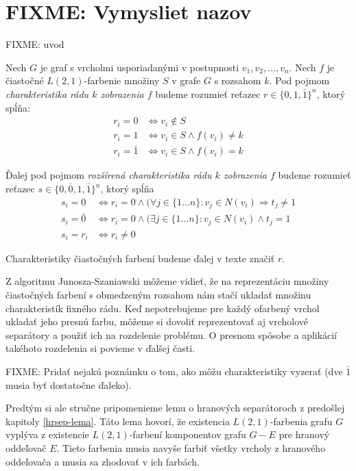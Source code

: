 \chapter{FIXME: Vymysliet nazov}

FIXME: uvod

\begin{defn}
    Nech $G$ je graf s vrcholmi usporiadanými v postupnosti $v_1,v_2, \ldots, v_n$.
    Nech $f$ je čiastočné $L(2,1)$-farbenie množiny $S$ v grafe $G$ s rozsahom $k$. Pod pojmom \emph{charakteristika rádu $k$
    zobrazenia $f$} budeme rozumieť reťazec $r \in \{0, 1, \bar{1}\}^n$, ktorý spĺňa:
    \begin{align*}
        r_i = 0 & \Leftrightarrow v_i \notin S \\
        r_i = 1 & \Leftrightarrow v_i \in S \wedge f(v_i) \neq k \\
        r_i = \bar{1} & \Leftrightarrow v_i \in S \wedge f(v_i) = k
    \end{align*}

    Ďalej pod pojmom \emph{rozšírená charakteristika rádu $k$ zobrazenia $f$} budeme rozumieť reťazec
    $s \in \{0, \bar{0}, 1, \bar{1}\}^n$, ktorý spĺňa
    \begin{align*}
        s_i = 0 & \Leftrightarrow r_i = 0 \wedge (\forall j \in \{1 \dots n\}: v_j \in N(v_i) \Rightarrow t_j \neq 1 \\
        s_i = \bar{0} & \Leftrightarrow r_i = 0 \wedge (\exists j \in \{1 \dots n\}: v_j \in N(v_i) \wedge t_j = 1 \\
        s_i = r_i & \Leftrightarrow r_i \neq 0
    \end{align*}

    Charakteristiky čiastočných farbení budeme ďalej v texte značiť $r$.
\end{defn}

Z algoritmu Junosza-Szaniawski môžeme vidieť, že na reprezentáciu množiny čiastočných farbení
s obmedzeným rozsahom nám stačí ukladať množinu charakteristík fixného rádu. Keď nepotrebujeme
pre každý ofarbený vrchol ukladať jeho presnú farbu, môžeme si dovoliť reprezentovať aj
vrcholové separátory a použiť ich na rozdelenie problému. O presnom spôsobe a aplikácií
takéhoto rozdelenia si povieme v ďalšej časti.

FIXME: Pridať nejakú poznámku o tom, ako môžu charakteristiky vyzerať (dve $\bar{1}$ musia byť
dostatočne ďaleko).

Predtým si ale stručne pripomenieme lemu o hranových separátoroch z predošlej kapitoly \ref{hrsep-lema}.
Táto lema hovorí, že existencia $L(2,1)$-farbenia grafu $G$ vyplýva z existencie $L(2,1)$-farbení
komponentov grafu $G-E$ pre hranový oddeľovač $E$. Tieto farbenia musia navyše farbiť všetky vrcholy
z hranového oddeľovača a musia sa zhodovať v ich farbách.

